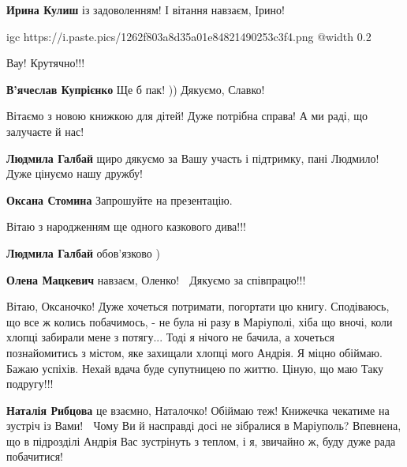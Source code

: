 \begin{itemize} %
\textbf{Ирина Кулиш} із задоволенням! І вітання навзаєм, Ірино! 🙂
\end{itemize} %


\ifcmt
  igc https://i.paste.pics/1262f803a8d35a01e84821490253c3f4.png
	@width 0.2
\fi


Вау! Крутячно!!!

\begin{itemize} %
\textbf{В'ячеслав Купрієнко} Ще б пак! )) Дякуємо, Славко! 🙂
\end{itemize} %


Вітаємо з новою книжкою для дітей! Дуже потрібна справа! А ми раді, що залучаєте й нас!

\begin{itemize} %
\textbf{Людмила Галбай} щиро дякуємо за Вашу участь і підтримку, пані Людмило! Дуже цінуємо нашу дружбу! 🙂

\textbf{Оксана Стомина} Запрошуйте на презентацію.


Вітаю з народженням ще одного казкового дива!!!

\textbf{Людмила Галбай} обов'язково )

\textbf{Олена Мацкевич} навзаєм, Оленко! 🙂 Дякуємо за співпрацю!!!
\end{itemize} %


Вітаю, Оксаночко! Дуже хочеться потримати, погортати цю книгу. Сподіваюсь, що
все ж колись побачимось, - не була ні разу в Маріуполі, хіба що вночі, коли
хлопці забирали мене з потягу... Тоді я нічого не бачила, а хочеться
познайомитись з містом, яке захищали хлопці мого Андрія. Я міцно обіймаю. Бажаю
успіхів. Нехай вдача буде супутницею по життю. Ціную, що маю Таку подругу!!!

\begin{itemize} %
\textbf{Наталія Рибцова} це взаємно, Наталочко! Обіймаю теж! Книжечка чекатиме на зустріч із Вами! 🙂 Чому Ви й насправді досі не зібралися в Маріуполь? Впевнена, що в підрозділі Андрія Вас зустрінуть з теплом, і я, звичайно ж, буду дуже рада побачитися!
\end{itemize} %

